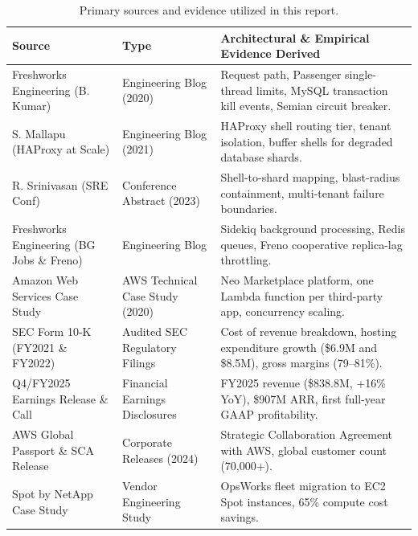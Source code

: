 \documentclass[10pt,a4paper]{article}
\begin{document}
\begin{table}[H]
\centering
\caption{Primary sources and evidence utilized in this report.}
\label{tab:sources}
\small
\begin{tabularx}{\textwidth}{l p{3.2cm} X}
\toprule
\textbf{Source} & \textbf{Type} & \textbf{Architectural \& Empirical Evidence Derived} \\
\midrule
Freshworks Engineering (B. Kumar) \cite{fw_scale_2020} & Engineering Blog (2020) & Request path, Passenger single-thread limits, MySQL transaction kill events, Semian circuit breaker. \\
S. Mallapu (HAProxy at Scale) \cite{fw_haproxy_2021} & Engineering Blog (2021) & HAProxy shell routing tier, tenant isolation, buffer shells for degraded database shards. \\
R. Srinivasan (SRE Conf) \cite{fw_sreconf_2023} & Conference Abstract (2023) & Shell-to-shard mapping, blast-radius containment, multi-tenant failure boundaries. \\
Freshworks Engineering (BG Jobs \& Freno) \cite{fw_freno} & Engineering Blog & Sidekiq background processing, Redis queues, Freno cooperative replica-lag throttling. \\
Amazon Web Services Case Study \cite{aws_freshworks_lambda} & AWS Technical Case Study (2020) & Neo Marketplace platform, one Lambda function per third-party app, concurrency scaling. \\
SEC Form 10-K (FY2021 \& FY2022) \cite{sec_10k_2021, sec_10k_2022} & Audited SEC Regulatory Filings & Cost of revenue breakdown, hosting expenditure growth (\$6.9M and \$8.5M), gross margins (79--81\%). \\
Q4/FY2025 Earnings Release \& Call \cite{fw_q4_2025, fw_fool_2025} & Financial Earnings Disclosures & FY2025 revenue (\$838.8M, +16\% YoY), \$907M ARR, first full-year GAAP profitability. \\
AWS Global Passport \& SCA Release \cite{aws_passport, fw_sca_2024} & Corporate Releases (2024) & Strategic Collaboration Agreement with AWS, global customer count (70,000+). \\
Spot by NetApp Case Study \cite{spot_freshworks} & Vendor Engineering Study & OpsWorks fleet migration to EC2 Spot instances, 65\% compute cost savings. \\
\bottomrule
\end{tabularx}
\end{table}
\end{document}
